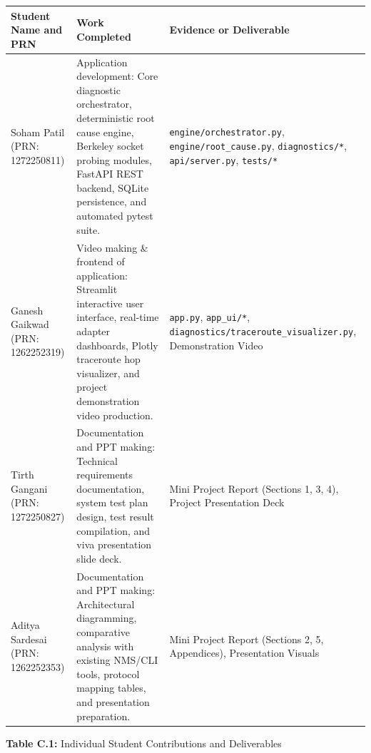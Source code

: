 \documentclass[
]{article}
\newcounter{none} %
\begin{document}
{\def\LTcaptype{none} %
\begin{longtable}[]{@{}
  >{\raggedright\arraybackslash}p{}
  >{\raggedright\arraybackslash}p{}
  >{\raggedright\arraybackslash}p{}@{}}
\toprule\noalign{}
\begin{minipage}[b]{\linewidth}\raggedright
\textbf{Student Name and PRN}
\end{minipage} & \begin{minipage}[b]{\linewidth}\raggedright
\textbf{Work Completed}
\end{minipage} & \begin{minipage}[b]{\linewidth}\raggedright
\textbf{Evidence or Deliverable}
\end{minipage} \\
\midrule\noalign{}
\endhead
\bottomrule\noalign{}
\endlastfoot
Soham Patil \newline (PRN: 1272250811) & Application development: Core diagnostic orchestrator, deterministic root cause engine, Berkeley socket probing modules, FastAPI REST backend, SQLite persistence, and automated pytest suite. & \texttt{engine/orchestrator.py}, \newline \texttt{engine/root\_cause.py}, \newline \texttt{diagnostics/*}, \newline \texttt{api/server.py}, \newline \texttt{tests/*} \\
\addlinespace
Ganesh Gaikwad \newline (PRN: 1262252319) & Video making \& frontend of application: Streamlit interactive user interface, real-time adapter dashboards, Plotly traceroute hop visualizer, and project demonstration video production. & \texttt{app.py}, \newline \texttt{app\_ui/*}, \newline \texttt{diagnostics/traceroute\_visualizer.py}, \newline Demonstration Video \\
\addlinespace
Tirth Gangani \newline (PRN: 1272250827) & Documentation and PPT making: Technical requirements documentation, system test plan design, test result compilation, and viva presentation slide deck. & Mini Project Report (Sections 1, 3, 4), \newline Project Presentation Deck \\
\addlinespace
Aditya Sardesai \newline (PRN: 1262252353) & Documentation and PPT making: Architectural diagramming, comparative analysis with existing NMS/CLI tools, protocol mapping tables, and presentation preparation. & Mini Project Report (Sections 2, 5, Appendices), \newline Presentation Visuals \\
\end{longtable}
}

\begin{center}
\textbf{Table C.1:} Individual Student Contributions and Deliverables
\end{center}
\end{document}
